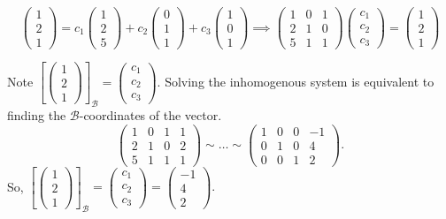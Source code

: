 \begin{enumerate}
\[\begin{pmatrix}1 \\ 2 \\ 1\end{pmatrix} = c_1\begin{pmatrix}1 \\ 2 \\ 5\end{pmatrix} + c_2\begin{pmatrix}0 \\ 1 \\ 1\end{pmatrix} + c_3\begin{pmatrix}1 \\ 0 \\ 1\end{pmatrix} \implies \begin{pmatrix}1 & 0 & 1 \\ 2 & 1 & 0 \\ 5 & 1 & 1\end{pmatrix}\begin{pmatrix}c_1 \\ c_2 \\ c_3\end{pmatrix} = \begin{pmatrix}1 \\ 2 \\1 \end{pmatrix}\]

		Note \(\left[\!\begin{pmatrix}1 \\ 2 \\1 \end{pmatrix}\!\right]_{\mathcal{B}} = \begin{pmatrix}c_1 \\ c_2 \\ c_3\end{pmatrix}\). Solving the inhomogenous system
		is equivalent to finding the \(\mathcal{B}\)-coordinates of the vector.
		\[\left(\!\!\begin{array}{ccc|c}1 & 0 & 1 & 1\\ 2 & 1 & 0 & 2\\ 5 & 1 & 1 & 1\end{array}\!\!\right) \sim \dots \sim \left(\!\!\begin{array}{ccc|c}1 & 0 & 0 & -1\\ 0 & 1 & 0 & 4\\ 0 & 0 & 1 & 2\end{array}\!\!\right).\]
		So, 
		\(\left[\!\begin{pmatrix}1 \\ 2 \\1 \end{pmatrix}\!\right]_{\mathcal{B}} = \begin{pmatrix}c_1 \\ c_2 \\ c_3\end{pmatrix} = \begin{pmatrix}-1 \\ 4 \\ 2\end{pmatrix}.\)
\end{enumerate}